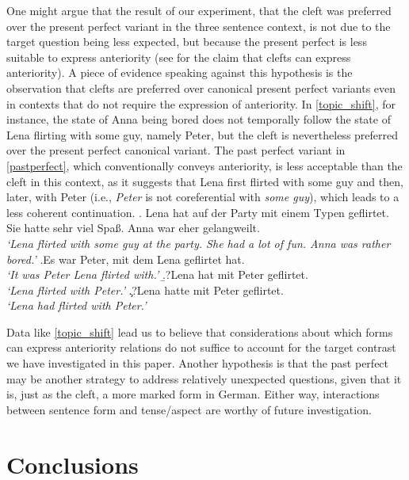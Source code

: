 \documentclass{salt}
\begin{document}
One might argue that the result of our experiment, that the cleft was preferred over the present perfect variant in the three sentence context, is not due to the target question being less expected, but because the present perfect is less suitable to express anteriority (see \cite{delin_oberlander_1992} for the claim that clefts can express anteriority). A piece of evidence speaking against this hypothesis is the observation that clefts are preferred over canonical present perfect variants even in contexts that do not require the expression of anteriority. In \ref{topic_shift}, for instance, the state of Anna being bored does not temporally follow the state of Lena flirting with some guy, namely Peter, but the cleft is nevertheless preferred over the present perfect canonical variant.  The past perfect variant in \ref{pastperfect}, which conventionally conveys anteriority, is less acceptable than the cleft in this context, as it suggests that Lena first flirted with some guy and then, later, with Peter (i.e., {\em Peter} is not coreferential with {\em some guy}), which leads to a less coherent continuation.\vspace{-0.5ex}
\ex.\label{topic_shift} Lena hat auf der Party mit einem Typen geflirtet. Sie hatte sehr viel Spaß. Anna war eher gelangweilt.\\
\textit{`Lena flirted with some guy at the party. She had a lot of fun. Anna was rather bored.'}
\a.\label{cleft5}Es war Peter, mit dem Lena geflirtet hat.\\
\textit{`It was Peter Lena flirted with.'}
\b.?\label{canonical5}Lena hat mit Peter geflirtet.\\
\textit{`Lena flirted with Peter.'}
\c.?\label{pastperfect}Lena hatte mit Peter geflirtet.\\ {\em `Lena had flirted with Peter.'}

Data like \ref{topic_shift} lead us to believe that considerations about which forms can express anteriority relations do not suffice to account for the target contrast we have investigated in this paper. Another hypothesis is that the past perfect may be another strategy to address relatively unexpected questions, given that it is, just as the cleft, a more marked form in German. Either way, interactions between sentence form and tense/aspect are worthy of future investigation.

\section{Conclusions}
\label{sec:conclusions}
\end{document}
